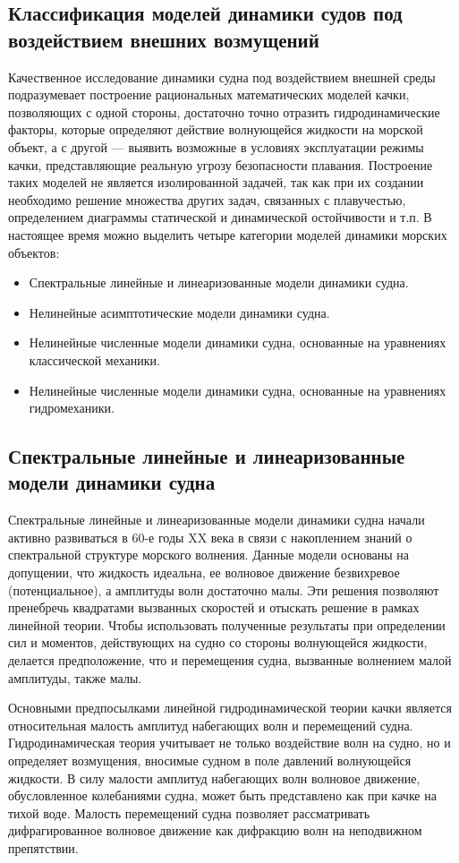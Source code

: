 \subsection{Классификация моделей динамики судов под воздействием внешних возмущений}

Качественное исследование динамики судна под воздействием внешней среды подразумевает построение рациональных математических моделей качки, позволяющих с одной стороны, достаточно точно отразить гидродинамические факторы, которые определяют действие волнующейся жидкости на морской объект, а с другой --- выявить возможные в условиях эксплуатации режимы качки, представляющие реальную угрозу безопасности плавания. Построение таких моделей не является изолированной задачей, так как при их создании необходимо решение множества других задач, связанных с плавучестью, определением диаграммы статической и динамической остойчивости и т.п.  В настоящее время можно выделить четыре категории моделей динамики морских объектов:
\begin{itemize}
\item	Спектральные линейные и линеаризованные модели динамики судна.
\item	Нелинейные асимптотические модели динамики судна.
\item	Нелинейные численные модели динамики судна, основанные на уравнениях классической механики.
\item	Нелинейные численные модели динамики судна, основанные на уравнениях гидромеханики.
\end{itemize}

\subsection{Спектральные линейные и линеаризованные модели динамики судна}
Спектральные линейные и линеаризованные модели динамики судна начали активно развиваться в 60-е годы XX века в связи с накоплением знаний о спектральной структуре морского волнения. Данные модели основаны на допущении, что жидкость идеальна, ее волновое движение безвихревое (потенциальное), а амплитуды волн достаточно малы. Эти решения позволяют пренебречь квадратами вызванных скоростей и отыскать решение в рамках линейной теории. Чтобы использовать полученные результаты при определении сил и моментов, действующих на судно со стороны волнующейся жидкости, делается предположение, что и перемещения судна, вызванные волнением малой амплитуды, также малы.

Основными предпосылками линейной гидродинамической теории качки является относительная малость амплитуд набегающих волн и перемещений судна. Гидродинамическая теория учитывает не только воздействие волн на судно, но и определяет возмущения, вносимые судном в поле давлений волнующейся жидкости. В силу малости амплитуд набегающих волн волновое движение, обусловленное колебаниями судна, может быть представлено как при качке на тихой воде. Малость перемещений судна позволяет рассматривать дифрагированное волновое движение как дифракцию волн на неподвижном препятствии.

